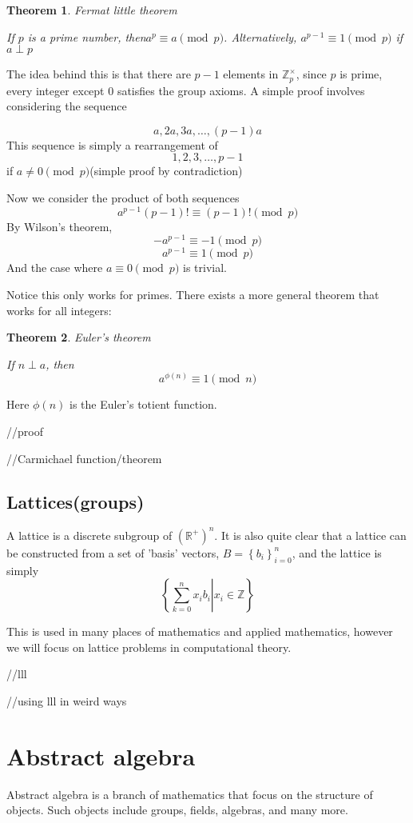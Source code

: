 \documentclass{report}
\newtheorem{theorem}{Theorem}[section]
\begin{document}
\begin{theorem}
	Fermat little theorem
	
	If $p$ is a prime number, then$a^p\equiv a\pmod p$. Alternatively, $a^{p-1}\equiv1\pmod p$ if $a\perp p$
\end{theorem}
The idea behind this is that there are $p-1$ elements in $\mathbb{Z}_p^\times$, since $p$ is prime, every integer except $0$ satisfies the group axioms. A simple proof involves considering the sequence

$$a,2a,3a,\dots,(p-1)a$$
This sequence is simply a rearrangement of 
$$1,2,3,\dots,p-1$$
if $a\neq 0\pmod p$(simple proof by contradiction)

Now we consider the product of both sequences
$$a^{p-1}(p-1)!\equiv(p-1)!\pmod p$$
By Wilson's theorem,
$$-a^{p-1}\equiv-1\pmod p$$
$$a^{p-1}\equiv1\pmod p$$
And the case where $a\equiv0\pmod p$ is trivial.

Notice this only works for primes. There exists a more general theorem that works for all integers:
\begin{theorem}
	Euler's theorem
	
	If $n\perp a$, then $$a^{\phi(n)}\equiv1\pmod n$$
\end{theorem}
Here $\phi(n)$ is the Euler's totient function.

//proof	

//Carmichael function/theorem

\section{Lattices(groups)}

A lattice is a discrete subgroup of $\left(\mathbb{R}^+\right)^n$. It is also quite clear that a lattice can be constructed from a set of 'basis' vectors, $B=\left\{b_i\right\}_{i=0}^n$, and the lattice is simply $$\left\{\left.\sum_{k=0}^{n}x_ib_i\right|x_i\in\mathbb{Z}\right\}$$

This is used in many places of mathematics and applied mathematics, however we will focus on lattice problems in computational theory.


//lll

//using lll in weird ways
\chapter{Abstract algebra}
Abstract algebra is a branch of mathematics that focus on the structure of objects. Such objects include groups, fields, algebras, and many more.
\end{document}
